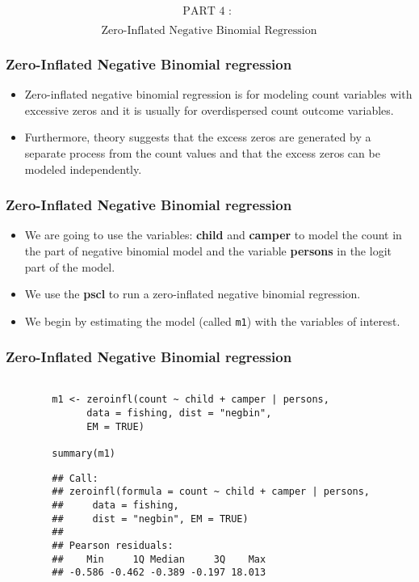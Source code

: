 \documentclass[MASTER.tex]{subfiles}
\begin{document}
\begin{frame}
	\LARGE
	
	\[  \mbox{PART 4 : } \]
		
	\[  \mbox{Zero-Inflated Negative Binomial Regression} \]
	

\end{frame}
\begin{frame}
\frametitle{Zero-Inflated Negative Binomial regression}	
\large
\begin{itemize} 
\item Zero-inflated negative binomial regression is for modeling count variables with excessive zeros and it is usually for overdispersed count outcome variables. 
\item Furthermore, theory suggests that the excess zeros are generated by a separate process from the count values and that the excess zeros can be modeled independently.
\end{itemize}
\end{frame}
	\begin{frame}
	\Large
		\frametitle{Zero-Inflated Negative Binomial regression}
\begin{itemize}
\item  We are going to use the variables: \textbf{child} and \textbf{camper} to model the count in the part of negative binomial model and the variable \textbf{persons} in the logit part of the model. 
\item We use the \textbf{pscl} to run a zero-inflated negative binomial regression. 
\item We begin by estimating the model (called \texttt{m1}) with the variables of interest.
\end{itemize}	
		

\end{frame}
\begin{frame}[fragile]
\frametitle{Zero-Inflated Negative Binomial regression}	
\large
\begin{verbatim}
		
		m1 <- zeroinfl(count ~ child + camper | persons,
			  data = fishing, dist = "negbin", 
			  EM = TRUE)
		
		summary(m1)
\end{verbatim}
\end{frame}
\begin{frame}[fragile]
	\begin{verbatim}
		## Call:
		## zeroinfl(formula = count ~ child + camper | persons, 
		##     data = fishing, 
		##     dist = "negbin", EM = TRUE)
		## 
		## Pearson residuals:
		##    Min     1Q Median     3Q    Max 
		## -0.586 -0.462 -0.389 -0.197 18.013 
\end{verbatim}
\end{frame}
\end{document}
